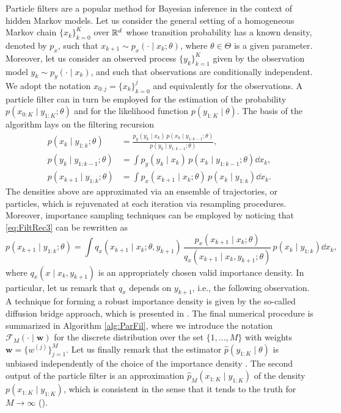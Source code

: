\documentclass[10pt]{article}
\begin{document}
Particle filters are a popular method for Bayesian inference in the context of hidden Markov models. Let us consider the general setting of a homogeneous Markov chain $\{x_k\}_{k=0}^K$ over $\mathbb{R}^d$ whose transition probability has a known density, denoted by $p_x$, such that $x_{k+1} \sim p_x(\cdot \mid x_k; \theta)$, where $\theta \in \Theta$ is a given parameter. Moreover, let us consider an observed process $\{y_k\}_{k=1}^K$ given by the observation model $y_k \sim p_y(\cdot \mid x_k)$, and such that observations are conditionally independent. We adopt the notation $x_{0:j} = \{x_k\}_{k=0}^j$ and equivalently for the observations. A particle filter can in turn be employed for the estimation of the probability $p(x_{0:K} \mid y_{1:K}; \theta)$ and for the likelihood function $p(y_{1:K} \mid \theta)$. The basis of the algorithm lays on the filtering recursion
\begin{subequations}\label{eq:FiltRec}
\begin{align}
	p(x_k \mid y_{1:k}; \theta) &= \frac{p_y(y_k \mid x_k) \, p(x_k \mid y_{1:k-1}; \theta)}{p(y_k \mid y_{1:k-1}; \theta)}, \label{eq:FiltRec1}\\
	p(y_k \mid y_{1:k-1}; \theta) &= \int p_y(y_k \mid x_k) \, p(x_k \mid y_{1:k-1}; \theta) \dd x_k, \label{eq:FiltRec2} \\
	p(x_{k+1} \mid y_{1:k}; \theta) &= \int p_x(x_{k+1} \mid x_k; \theta) \, p(x_k \mid y_{1:k}) \dd x_k. \label{eq:FiltRec3}
\end{align}
\end{subequations}
The densities above are approximated via an ensemble of trajectories, or particles, which is rejuvenated at each iteration via resampling procedures. Moreover, importance sampling techniques can be employed by noticing that \eqref{eq:FiltRec3} can be rewritten as
\begin{equation}
	p(x_{k+1} \mid y_{1:k}; \theta) = \int q_x(x_{k+1} \mid x_k; \theta, y_{k+1}) \, \frac{p_x(x_{k+1} \mid x_k; \theta)}{q_x(x_{k+1} \mid x_k, y_{k+1}; \theta)} \, p(x_k \mid y_{1:k}) \dd x_k,
\end{equation}
where $q_x(x \mid x_k, y_{k+1})$ is an appropriately chosen valid importance density. In particular, let us remark that $q_x$ depends on $y_{k+1}$, i.e., the following observation. A technique for forming a robust importance density is given by the so-called diffusion bridge approach, which is presented in \cite{GoW10, GoW11}. The final numerical procedure is summarized in Algorithm \ref{alg:ParFil}, where we introduce the notation $\mathcal F_M(\cdot \mid \mathbf w)$ for the discrete distribution over the set $\{1, \ldots, M\}$ with weights $\mathbf w = \{w^{(j)}\}_{j=1}^M$. Let us finally remark that the estimator $\hat p(y_{1:K} \mid \theta)$ is unbiased independently of the choice of the importance density \cite{PSG12}. The second output of the particle filter is an approximation $\hat p_M(x_{1:K} \mid y_{1:K})$ of the density $p(x_{1:K} \mid y_{1:K})$, which is consistent in the sense that it tends to the truth for $M \to \infty$ ().
\end{document}

